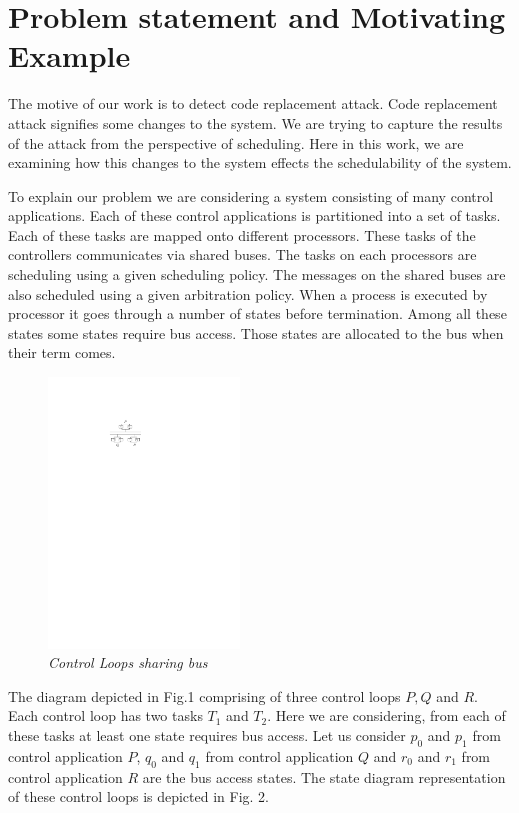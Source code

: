 \section{Problem statement and Motivating Example} \label{sec3}
\noindent
The motive of our work is to detect code replacement attack. Code replacement attack
signifies some changes to the system. We are trying to capture the results of the 
attack from the perspective of scheduling.  Here in this work, we are examining
how this changes to the system effects the schedulability of the system. 

To explain our problem we are considering a system consisting of many control
applications. Each of these control applications is partitioned into a set of
tasks. Each of these tasks are mapped onto different processors. These tasks 
of the controllers communicates via shared buses. The tasks on each processors
are scheduling using a given scheduling policy. The messages on the shared buses
are also scheduled using a given arbitration policy. When a process is executed by processor
it goes through a number of states before termination. Among all these states some
states require bus access. Those states are allocated to the bus when their term
comes. 

\begin{figure}[h]
\begin{center}
\includegraphics[width=2.0in]{system_diagram_3_loop.pdf}
\end{center}
\vspace{-0.1in}
\caption{{\em Control Loops sharing bus}}
\label{fig:automaton}
\end{figure}

The diagram depicted in Fig.1 comprising of three control loops $P,Q$ and $R$. 
Each control loop has two tasks $T_1$ and $T_2$. Here we are considering, from each of these tasks at least one
state requires bus access. Let us consider $p_0$ and $p_1$ from control application $P$,
$q_0$ and $q_1$ from control application $Q$ and $r_0$ and $r_1$ from control application
$R$ are the bus access states. The state diagram representation of these control loops is 
depicted in Fig. 2.

